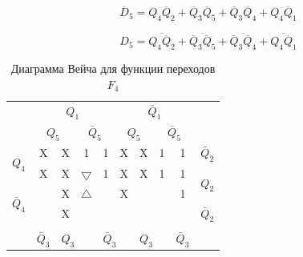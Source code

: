 \documentclass[a4paper,14pt]{article}
\begin{document}
$$\overline{D}_5 = Q_4\overline{Q}_2 + \overline{Q}_3\overline{Q}_5 + \overline{Q}_3\overline{Q}_4 + Q_4\overline{Q}_1$$

$$D_5 = \overline{Q_4\overline{Q}_2} + \overline{\overline{Q}_3\overline{Q}_5} + \overline{\overline{Q}_3\overline{Q}_4} + \overline{Q_4\overline{Q}_1}$$



\begin{table}[H]
	\begin{center}
		\caption{\label{tab:F4_tab} Диаграмма Вейча для функции переходов $F_4$ }
		\begin{tabular}{cccccccccc}
			& \multicolumn{4}{c}{$Q_1$} & \multicolumn{4}{c}{$\bar{Q}_1$} &  \\
			& \multicolumn{2}{c}{$Q_5$} & \multicolumn{2}{c}{$\bar{Q}_5$} & \multicolumn{2}{c}{$Q_5$} & \multicolumn{2}{c}{$\bar{Q}_5$} &  \\ \cline{2-9}
			\multicolumn{1}{c|}{\multirow{2}{*}{$Q_4$}} & \multicolumn{1}{c|}{X} & \multicolumn{1}{c|}{X} & \multicolumn{1}{c|}{1} & \multicolumn{1}{c|}{1} & \multicolumn{1}{c|}{X} & \multicolumn{1}{c|}{X} & \multicolumn{1}{c|}{1} & \multicolumn{1}{c|}{1} & $\bar{Q}_2$ \\ \cline{2-9}
			\multicolumn{1}{c|}{} & \multicolumn{1}{c|}{X} & \multicolumn{1}{c|}{X} & \multicolumn{1}{c|}{$\bigtriangledown$} & \multicolumn{1}{c|}{1} & \multicolumn{1}{c|}{X} & \multicolumn{1}{c|}{X} & \multicolumn{1}{c|}{1} & \multicolumn{1}{c|}{1} & \multirow{2}{*}{$Q_2$} \\ \cline{2-9}
			\multicolumn{1}{c|}{\multirow{2}{*}{$\bar{Q}_4$}} & \multicolumn{1}{c|}{} & \multicolumn{1}{c|}{X} & \multicolumn{1}{c|}{$\bigtriangleup$} & \multicolumn{1}{c|}{} & \multicolumn{1}{c|}{X} & \multicolumn{1}{c|}{} & \multicolumn{1}{c|}{} & \multicolumn{1}{c|}{1} &  \\ \cline{2-9}
			\multicolumn{1}{c|}{} & \multicolumn{1}{c|}{} & \multicolumn{1}{c|}{X} & \multicolumn{1}{c|}{} & \multicolumn{1}{c|}{} & \multicolumn{1}{c|}{} & \multicolumn{1}{c|}{} & \multicolumn{1}{c|}{} & \multicolumn{1}{c|}{} & $\bar{Q}_2$ \\ \cline{2-9}
			&  & \multicolumn{2}{c}{} & \multicolumn{2}{c}{} & \multicolumn{2}{c}{} &  &  \\
			\multicolumn{1}{l}{} & \multicolumn{1}{l}{$\bar{Q}_3$} & \multicolumn{2}{l}{$Q_3$} & \multicolumn{2}{l}{$\bar{Q}_3$} & \multicolumn{2}{l}{$Q_3$} & \multicolumn{1}{l}{$\bar{Q}_3$} & \multicolumn{1}{l}{}
		\end{tabular}
	\end{center}
\end{table}
\end{document}
